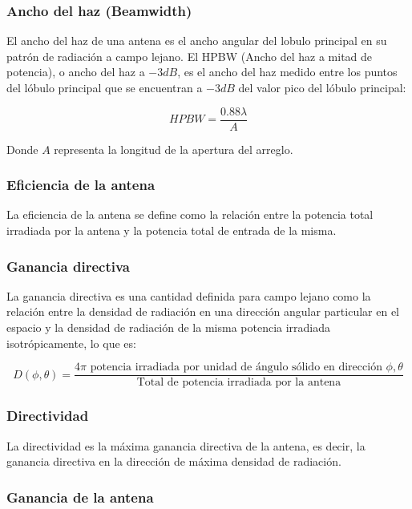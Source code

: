 \subsubsection{Ancho del haz (Beamwidth)}

El ancho del haz de una antena es el ancho angular del lobulo principal en su patrón de radiación a campo lejano. El HPBW (Ancho del haz a mitad de potencia), o ancho del haz a $-3 dB$, es el ancho del haz medido entre los puntos del lóbulo principal que se encuentran a $-3 dB$ del valor pico del lóbulo principal:

\begin{equation}
HPBW = \frac{0.88 \lambda}{A}
\end{equation}

Donde $A$ representa la longitud de la apertura del arreglo.

\subsubsection{Eficiencia de la antena}

La eficiencia de la antena se define como la relación entre la potencia total irradiada por la antena y la potencia total de entrada de la misma.

\subsubsection{Ganancia directiva}

La ganancia directiva es una cantidad definida para campo lejano como la relación entre la densidad de radiación en una dirección angular particular en el espacio y la densidad de radiación de la misma potencia irradiada isotrópicamente, lo que es:

\begin{equation}
D(\phi,\theta) = \frac{4 \pi \text{ potencia irradiada por unidad de ángulo sólido en dirección } \phi,\theta }{\text{Total de potencia irradiada por la antena}}
\end{equation}

\subsubsection{Directividad}

La directividad es la máxima ganancia directiva de la antena, es decir, la ganancia directiva en la dirección de máxima densidad de radiación.

\subsubsection{Ganancia de la antena}

